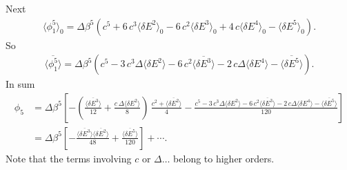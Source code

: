 \documentclass[aip,jcp,preprint,notitlepage, superscriptaddress]{revtex4-1}
\begin{document}
Next
\begin{align*}
\langle \phi_1^5 \rangle_0
=
\Delta \beta^5
\left(
c^5 + 6 \, c^3 \langle \delta E^2 \rangle_0
-6 \, c^2 \langle \delta E^3 \rangle_0
+4 \, c \langle \delta E^4 \rangle_0
-\langle \delta E^5 \rangle_0
\right).
\end{align*}
So
\begin{align*}
\overline{ \langle \phi_1^5 \rangle }
=
\Delta \beta^5
\left(
c^5
- 3 \, c^3 \Delta \langle \delta E^2 \rangle
-6 \, c^2 \overline{ \langle \delta E^3 \rangle }
-2 \, c \Delta \langle \delta E^4 \rangle
-\overline{ \langle \delta E^5 \rangle }
\right).
\end{align*}
In sum
\begin{align*}
\phi_5
&=
\Delta \beta^5
\left[
  -\left(
    \frac{ \overline{ \langle \delta E^3 \rangle } }
         { 12 }
    +
    \frac{ c \, \Delta \langle \delta E^2 \rangle }
         { 8 }
  \right)
\, \frac{ c^2 + \overline{ \langle \delta E^2 \rangle } }
        { 4 }
-\frac{
  c^5
  - 3 \, c^3 \Delta \langle \delta E^2 \rangle
  -6 \, c^2 \overline{ \langle \delta E^3 \rangle }
  -2 \, c \Delta \langle \delta E^4 \rangle
  -\overline{ \langle \delta E^5 \rangle }
} { 120 }
\right] \\
&=
\Delta \beta^5
\left[
  -\frac{ \overline{ \langle \delta E^3 \rangle }
          \overline{ \langle \delta E^2 \rangle } }
        { 48 }
+\frac{
  \overline{ \langle \delta E^5 \rangle }
} { 120 }
\right] + \cdots.
\end{align*}
%
Note that the terms involving $c$ or $\Delta \dots$
belong to higher orders.




\end{document}

